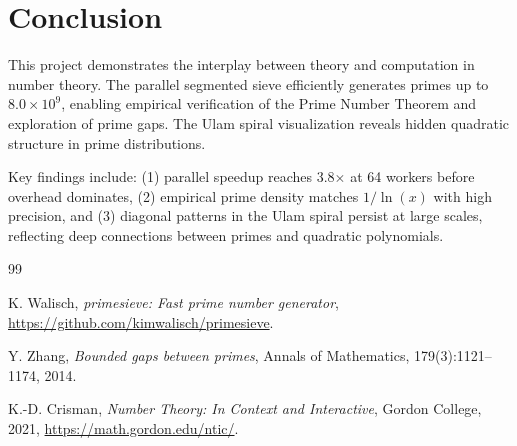 \documentclass[12pt]{article}
\theoremstyle{plain}
\theoremstyle{remark}
\theoremstyle{definition}
\begin{document}
\section{Conclusion}

This project demonstrates the interplay between theory and computation in number 
theory. The parallel segmented sieve efficiently generates primes up to $8.0\times10^9$, 
enabling empirical verification of the Prime Number Theorem and exploration of 
prime gaps. The Ulam spiral visualization reveals hidden quadratic structure in 
prime distributions.

Key findings include: (1) parallel speedup reaches 3.8$\times$ at 64 workers 
before overhead dominates, (2) empirical prime density matches $1/\ln(x)$ with 
high precision, and (3) diagonal patterns in the Ulam spiral persist at large 
scales, reflecting deep connections between primes and quadratic polynomials.

\begin{thebibliography}{99}

     K. Walisch, \textit{primesieve: Fast prime number generator}, 
    \url{https://github.com/kimwalisch/primesieve}.

     Y. Zhang, \textit{Bounded gaps between primes}, Annals of 
    Mathematics, 179(3):1121--1174, 2014.

     K.-D. Crisman, \textit{Number Theory: In Context and 
    Interactive}, Gordon College, 2021, \url{https://math.gordon.edu/ntic/}.

\end{thebibliography}
\end{document}
